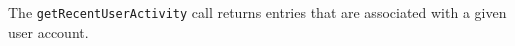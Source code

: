 The \verb+getRecentUserActivity+ call returns entries that are associated with a given user account.
